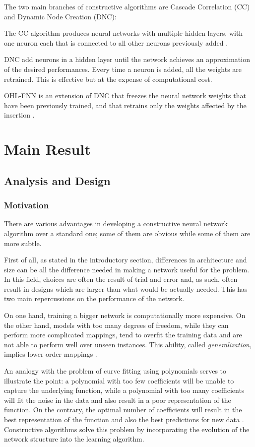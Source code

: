 \documentclass[11pt,a4paper]{report}
\begin{document}
			The two main branches of constructive algorithms are Cascade Correlation (CC) and Dynamic Node Creation (DNC):
			
			The CC algorithm produces neural networks with multiple hidden layers, with one neuron each that is connected to all other neurons previously added \cite{sharma2010constructive}.
					
			DNC add neurons in a hidden layer until the network achieves an approximation of the desired performances.
			Every time a neuron is added, all the weights are retrained. This is effective but at the expense of computational cost. \cite{sharma2010constructive}
					
			OHL-FNN is an extension of DNC that freezes the neural network weights that have been previously trained, and that retrains only the weights affected by the insertion \cite{kwok1997objective}.

	
	\chapter{Main Result}
		\section{Analysis and Design}
			\subsection{Motivation}
				\label{sec:motivation}
				There are various advantages in developing a constructive neural network algorithm over a standard one; some of them are obvious while some of them are more subtle.
				
				First of all, as stated in the introductory section, differences in architecture and size can be all the difference needed in making a network useful for the problem. In this field, choices are often the result of trial and error and, as such, often result in designs which are larger than what would be actually needed. This has two main repercussions on the performance of the network.
				
				On one hand, training a bigger network is computationally more expensive. On the other hand, models with too many degrees of freedom, while they can perform more complicated mappings, tend to overfit the training data and are not able to perform well over unseen instances. This ability, called \emph{generalization}, implies lower order mappings \cite{alpaydin1994gal}.
				
				An analogy with the problem of curve fitting using polynomials serves to illustrate the point: a polynomial with too few coefficients will be unable to capture the underlying function, while a polynomial with too many coefficients will fit the noise in the data and also result in a poor representation of the function. On the contrary, the optimal number of coefficients will result in the best representation of the function and also the best predictions for new data \cite{kwok1997objective}. Constructive algorithms solve this problem by incorporating the evolution of the network structure into the learning algorithm.
				
\end{document}
